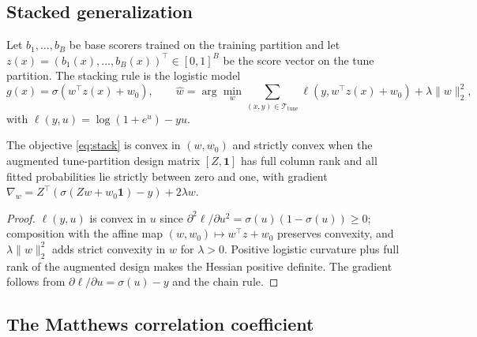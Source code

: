 \subsection{Stacked generalization}
\label{sec:stack-math}

Let $b_1, \dots, b_B$ be base scorers trained on the training partition
and let $z(x) = (b_1(x), \dots, b_B(x))^\top \in [0,1]^B$ be the score
vector on the tune partition. The stacking rule is the logistic model
\begin{equation}
g(x) = \sigma(w^\top z(x) + w_0), \qquad
\hat w = \arg\min_{w} \sum_{(x,y) \in \mathcal{T}_{\mathrm{tune}}}
  \ell(y, w^\top z(x) + w_0) + \lambda \|w\|_2^2,
\label{eq:stack}
\end{equation}
with $\ell(y, u) = \log(1 + e^{u}) - yu$.

\begin{proposition}
\label{prop:stack-convex}
The objective \eqref{eq:stack} is convex in $(w,w_0)$ and strictly convex
when the augmented tune-partition design matrix $[Z,\mathbf1]$ has full
column rank and all fitted probabilities lie strictly between zero and one, with gradient
$\nabla_w = Z^\top(\sigma(Zw + w_0\mathbf 1) - y) + 2\lambda w$.
\end{proposition}
\begin{proof}
$\ell(y, u)$ is convex in $u$ since
$\partial^2 \ell / \partial u^2 = \sigma(u)(1-\sigma(u)) \ge 0$;
composition with the affine map $(w,w_0) \mapsto w^\top z + w_0$ preserves
convexity, and $\lambda\|w\|_2^2$ adds strict convexity in $w$ for
$\lambda > 0$. Positive logistic curvature plus full rank of the
augmented design makes the Hessian positive definite. The gradient follows from
$\partial \ell / \partial u = \sigma(u) - y$ and the chain rule.
\end{proof}

\subsection{The Matthews correlation coefficient}\label{sec:mcc}
\label{sec:mcc-math}

